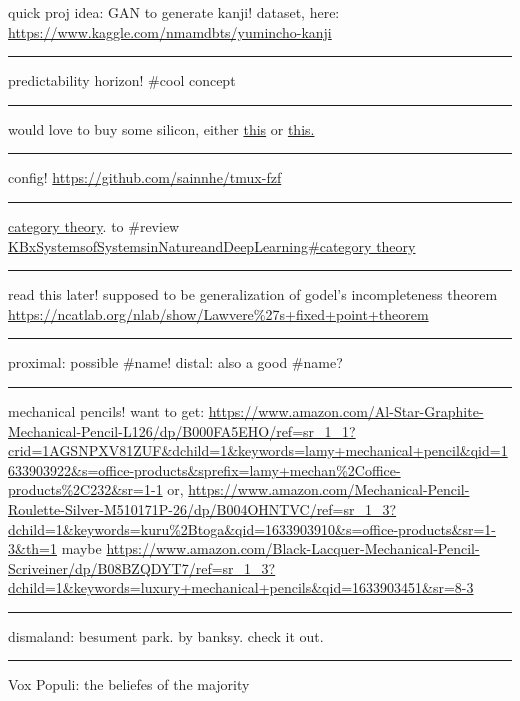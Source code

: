 \documentclass[letterpaper]{article}
\begin{document}
quick proj idea: GAN to generate kanji! dataset, here:
\url{https://www.kaggle.com/nmamdbts/yumincho-kanji}

\noindent\rule{\textwidth}{0.5pt}

predictability horizon! \#cool concept

\noindent\rule{\textwidth}{0.5pt}

would love to buy some silicon, either
\href{https://www.amazon.com/Silicon-Metal-99-999-Pure/dp/B08FVLJM8L}{this}
or
\href{https://www.amazon.com/Silicon-Wafer-Single-Sided-Polish/dp/B08RZ5ZYNF/}{this.}

\noindent\rule{\textwidth}{0.5pt}

config! \url{https://github.com/sainnhe/tmux-fzf}

\noindent\rule{\textwidth}{0.5pt}

\href{https://ncatlab.org/nlab/show/category+theory}{category theory}. to
\#review \href{KBxSystemsofSystemsinNatureandDeepLearning\#category theory.org}{KBxSystemsofSystemsinNatureandDeepLearning\#category theory}

\noindent\rule{\textwidth}{0.5pt}

read this later! supposed to be generalization of godel's incompleteness
theorem \url{https://ncatlab.org/nlab/show/Lawvere\%27s+fixed+point+theorem}

\noindent\rule{\textwidth}{0.5pt}

proximal: possible \#name! distal: also a good \#name?

\noindent\rule{\textwidth}{0.5pt}

mechanical pencils! want to get:
\url{https://www.amazon.com/Al-Star-Graphite-Mechanical-Pencil-L126/dp/B000FA5EHO/ref=sr\_1\_1?crid=1AGSNPXV81ZUF\&dchild=1\&keywords=lamy+mechanical+pencil\&qid=1633903922\&s=office-products\&sprefix=lamy+mechan\%2Coffice-products\%2C232\&sr=1-1}
or,
\url{https://www.amazon.com/Mechanical-Pencil-Roulette-Silver-M510171P-26/dp/B004OHNTVC/ref=sr\_1\_3?dchild=1\&keywords=kuru\%2Btoga\&qid=1633903910\&s=office-products\&sr=1-3\&th=1}
maybe
\url{https://www.amazon.com/Black-Lacquer-Mechanical-Pencil-Scriveiner/dp/B08BZQDYT7/ref=sr\_1\_3?dchild=1\&keywords=luxury+mechanical+pencils\&qid=1633903451\&sr=8-3}

\noindent\rule{\textwidth}{0.5pt}

dismaland: besument park. by banksy. check it out.

\noindent\rule{\textwidth}{0.5pt}

Vox Populi: the beliefes of the majority
\end{document}
